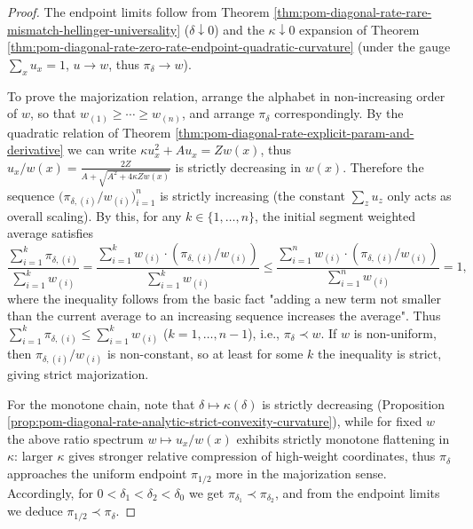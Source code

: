 \begin{proof}
The endpoint limits follow from Theorem \ref{thm:pom-diagonal-rate-rare-mismatch-hellinger-universality} (\(\delta\downarrow 0\)) and
the \(\kappa\downarrow 0\) expansion of Theorem \ref{thm:pom-diagonal-rate-zero-rate-endpoint-quadratic-curvature} (under the gauge \(\sum_x u_x=1\), \(u\to w\), thus \(\pi_\delta\to w\)).
\par
To prove the majorization relation, arrange the alphabet in non-increasing order of \(w\), so that \(w_{(1)}\ge\cdots\ge w_{(n)}\), and arrange \(\pi_\delta\) correspondingly.
By the quadratic relation of Theorem \ref{thm:pom-diagonal-rate-explicit-param-and-derivative} we can write
\(
\kappa u_x^2+A u_x=Zw(x)
\),
thus
\(
u_x/w(x)=\frac{2Z}{A+\sqrt{A^2+4\kappa Zw(x)}}
\)
is strictly decreasing in \(w(x)\).
Therefore the sequence \(\bigl(\pi_{\delta,(i)}/w_{(i)}\bigr)_{i=1}^n\) is strictly increasing (the constant \(\sum_z u_z\) only acts as overall scaling).
By this, for any \(k\in\{1,\dots,n\}\), the initial segment weighted average satisfies
\[
\frac{\sum_{i=1}^k \pi_{\delta,(i)}}{\sum_{i=1}^k w_{(i)}}
=\frac{\sum_{i=1}^k w_{(i)}\cdot(\pi_{\delta,(i)}/w_{(i)})}{\sum_{i=1}^k w_{(i)}}
\le \frac{\sum_{i=1}^n w_{(i)}\cdot(\pi_{\delta,(i)}/w_{(i)})}{\sum_{i=1}^n w_{(i)}}
=1,
\]
where the inequality follows from the basic fact "adding a new term not smaller than the current average to an increasing sequence increases the average".
Thus \(\sum_{i=1}^k \pi_{\delta,(i)}\le \sum_{i=1}^k w_{(i)}\) (\(k=1,\dots,n-1\)), i.e., \(\pi_\delta\prec w\).
If \(w\) is non-uniform, then \(\pi_{\delta,(i)}/w_{(i)}\) is non-constant, so at least for some \(k\) the inequality is strict, giving strict majorization.
\par
For the monotone chain, note that \(\delta\mapsto \kappa(\delta)\) is strictly decreasing (Proposition \ref{prop:pom-diagonal-rate-analytic-strict-convexity-curvature}), while for fixed \(w\) the above ratio spectrum
\(
w\mapsto u_x/w(x)
\)
exhibits strictly monotone flattening in \(\kappa\): larger \(\kappa\) gives stronger relative compression of high-weight coordinates, thus \(\pi_\delta\) approaches the uniform endpoint \(\pi_{1/2}\) more in the majorization sense.
Accordingly, for \(0<\delta_1<\delta_2<\delta_0\) we get \(\pi_{\delta_1}\prec \pi_{\delta_2}\), and from the endpoint limits we deduce \(\pi_{1/2}\prec \pi_\delta\).
\end{proof}

